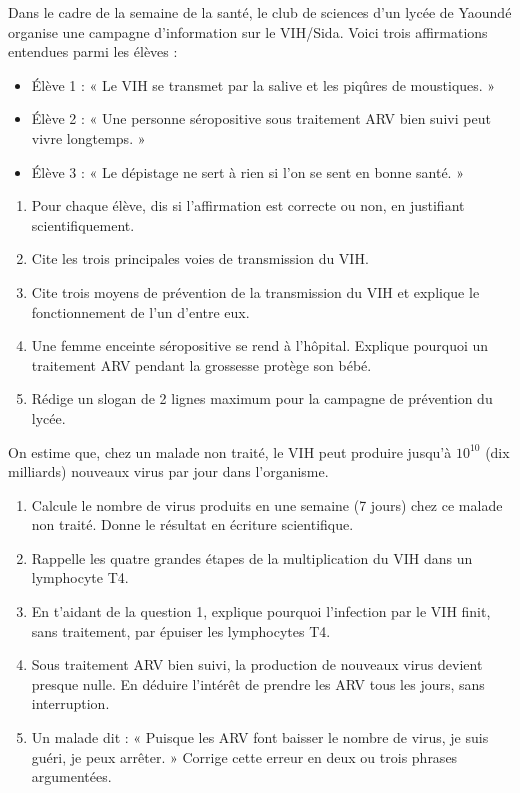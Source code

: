 \documentclass[11pt]{article}
\begin{document}
\begin{exercice}
Dans le cadre de la semaine de la santé, le club de sciences d'un lycée de Yaoundé organise une campagne d'information sur le VIH/Sida. Voici trois affirmations entendues parmi les élèves :
\begin{itemize}
\item Élève 1 : « Le VIH se transmet par la salive et les piqûres de moustiques. »
\item Élève 2 : « Une personne séropositive sous traitement ARV bien suivi peut vivre longtemps. »
\item Élève 3 : « Le dépistage ne sert à rien si l'on se sent en bonne santé. »
\end{itemize}
\begin{enumerate}
\item Pour chaque élève, dis si l'affirmation est correcte ou non, en justifiant scientifiquement.
\item Cite les trois principales voies de transmission du VIH.
\item Cite trois moyens de prévention de la transmission du VIH et explique le fonctionnement de l'un d'entre eux.
\item Une femme enceinte séropositive se rend à l'hôpital. Explique pourquoi un traitement ARV pendant la grossesse protège son bébé.
\item Rédige un slogan de 2 lignes maximum pour la campagne de prévention du lycée.
\end{enumerate}
\end{exercice}

\begin{exercice}
On estime que, chez un malade non traité, le VIH peut produire jusqu'à $10^{10}$ (dix milliards) nouveaux virus par jour dans l'organisme.
\begin{enumerate}
\item Calcule le nombre de virus produits en une semaine (7 jours) chez ce malade non traité. Donne le résultat en écriture scientifique.
\item Rappelle les quatre grandes étapes de la multiplication du VIH dans un lymphocyte T4.
\item En t'aidant de la question 1, explique pourquoi l'infection par le VIH finit, sans traitement, par épuiser les lymphocytes T4.
\item Sous traitement ARV bien suivi, la production de nouveaux virus devient presque nulle. En déduire l'intérêt de prendre les ARV tous les jours, sans interruption.
\item Un malade dit : « Puisque les ARV font baisser le nombre de virus, je suis guéri, je peux arrêter. » Corrige cette erreur en deux ou trois phrases argumentées.
\end{enumerate}
\end{exercice}
\end{document}
